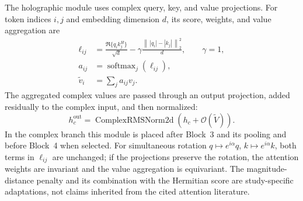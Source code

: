 The holographic module uses complex query, key, and value projections. For token indices $i,j$ and embedding dimension $d$, its score, weights, and value aggregation are
\begin{align}
\ell_{ij}&=\frac{\Re\{q_i k_j^H\}}{\sqrt d}-\gamma\frac{\left\|\,|q_i|-|k_j|\,\right\|_2^2}{d},\qquad \gamma=1,\\
a_{ij}&=\operatorname{softmax}_{j}(\ell_{ij}),\\
\widetilde v_i&=\sum_j a_{ij}v_j.
\end{align}
The aggregated complex values are passed through an output projection, added residually to the complex input, and then normalized:
\begin{equation}
 h_c^{\mathrm{out}}=\operatorname{ComplexRMSNorm2d}\!\left(h_c+\mathcal{O}(\widetilde V)\right).
\end{equation}
In the complex branch this module is placed after Block~3 and its pooling and before Block~4 when selected. For simultaneous rotation $q\mapsto e^{i\alpha}q$, $k\mapsto e^{i\alpha}k$, both terms in $\ell_{ij}$ are unchanged; if the projections preserve the rotation, the attention weights are invariant and the value aggregation is equivariant. The magnitude-distance penalty and its combination with the Hermitian score are study-specific adaptations, not claims inherited from the cited attention literature.

